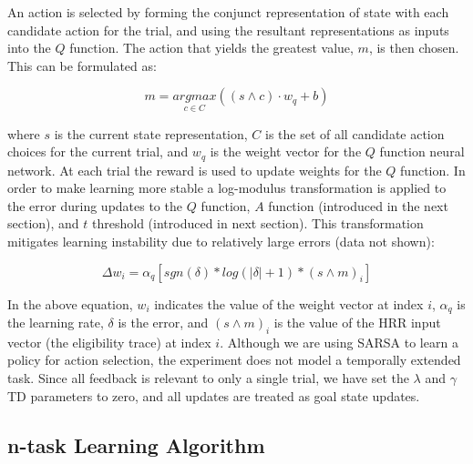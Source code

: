\documentclass[10pt,letterpaper]{article}
\begin{document}
An action is selected by forming the conjunct representation of state with each candidate action for the trial, and using the resultant representations as inputs into the $ Q $ function. The action that yields the greatest value, $m$, is then chosen. This can be formulated as:

\begin{equation}
m = \underset{c \in C}{argmax}((s \wedge c) \cdot w_{q}+b)
\label{eq:action_selection}
\end{equation}

\noindent where $ s $ is the current state representation, $ C $ is the set of all candidate action choices for the current trial, and $ w_{q} $ is the weight vector for the $ Q $ function neural network. At each trial the reward is used to update weights for the $Q$ function. In order to make learning more stable a log-modulus transformation \cite{john_alternative_1980} is applied to the error during updates to the $ Q $ function, $ A $ function (introduced in the next section), and $t$ threshold (introduced in next section). This transformation mitigates learning instability due to relatively large errors (data not shown):

\begin{equation}
\Delta w_i = \alpha_q [sgn(\delta) * log(| \delta | + 1) * (s \wedge m)_i]
\label{eq:weight_update_transform}
\end{equation}

In the above equation, $ w_i $ indicates the value of the weight vector at index $ i $, $ \alpha_q $ is the learning rate, $ \delta $ is the error, and $ (s \wedge m)_i $ is the value of the HRR input vector (the eligibility trace) at index $ i $. Although we are using SARSA to learn a policy for action selection, the experiment does not model a temporally extended task. Since all feedback is relevant to only a single trial, we have set the $\lambda$ and $\gamma$ TD parameters to zero, and all updates are treated as goal state updates.

\subsection{n-task Learning Algorithm}
\label{sec:n-task}
\end{document}
